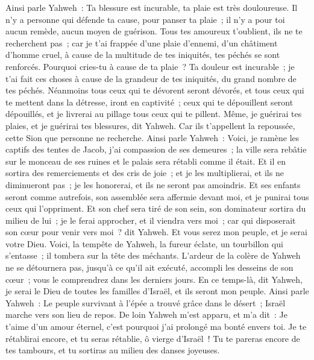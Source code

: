 \begin{multicols}{2}
Ainsi parle Yahweh~: Ta blessure est incurable, ta plaie est très douloureuse.
Il n'y a personne qui défende ta cause, pour panser ta plaie~; il n'y a pour toi aucun remède, aucun moyen de guérison.
Tous tes amoureux t'oublient, ils ne te recherchent pas~; car je t'ai frappée d'une plaie d'ennemi, d'un châtiment d'homme cruel, à cause de la multitude de tes iniquités, tes péchés se sont renforcés.
Pourquoi cries-tu à cause de ta plaie~? Ta douleur est incurable~; je t'ai fait ces choses à cause de la grandeur de tes iniquités, du grand nombre de tes péchés.
Néanmoins tous ceux qui te dévorent seront dévorés, et tous ceux qui te mettent dans la détresse, iront en captivité~; ceux qui te dépouillent seront dépouillés, et je livrerai au pillage tous ceux qui te pillent.
Même, je guérirai tes plaies, et je guérirai tes blessures, dit Yahweh. Car ils t'appellent la repoussée, cette Sion que personne ne recherche.
Ainsi parle Yahweh~: Voici, je ramène les captifs des tentes de Jacob, j'ai compassion de ses demeures~; la ville sera rebâtie sur le monceau de ses ruines et le palais sera rétabli comme il était.
Et il en sortira des remerciements et des cris de joie~; et je les multiplierai, et ils ne diminueront pas~; je les honorerai, et ils ne seront pas amoindris.
Et ses enfants seront comme autrefois, son assemblée sera affermie devant moi, et je punirai tous ceux qui l'oppriment.
Et son chef sera tiré de son sein, son dominateur sortira du milieu de lui~; je le ferai approcher, et il viendra vers moi~; car qui disposerait son cœur pour venir vers moi~? dit Yahweh.
Et vous serez mon peuple, et je serai votre Dieu.
Voici, la tempête de Yahweh, la fureur éclate, un tourbillon qui s'entasse~; il tombera sur la tête des méchants.
L'ardeur de la colère de Yahweh ne se détournera pas, jusqu'à ce qu'il ait exécuté, accompli les desseins de son cœur~; vous le comprendrez dans les derniers jours.
\VerseOne{}En ce temps-là, dit Yahweh, je serai le Dieu de toutes les familles d'Israël, et ils seront mon peuple.
Ainsi parle Yahweh~: Le peuple survivant à l'épée a trouvé grâce dans le désert~; Israël marche vers son lieu de repos.
De loin Yahweh m'est apparu, et m'a dit~: Je t'aime d'un amour éternel, c'est pourquoi j'ai prolongé ma bonté envers toi.
Je te rétablirai encore, et tu seras rétablie, ô vierge d'Israël~! Tu te pareras encore de tes tambours, et tu sortiras au milieu des danses joyeuses.

\end{multicols}
